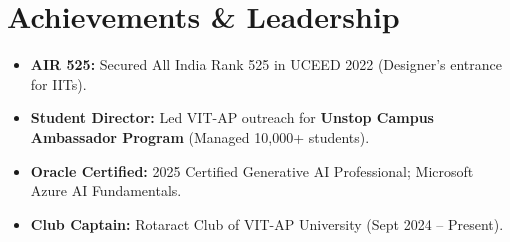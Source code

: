 \documentclass[letterpaper,11pt]{article}
\newcommand{\resumeItem}[1]{
  \item\small{
    {#1 \vspace{-2pt}}
  }
}
\newcommand{\resumeItemListStart}{\begin{itemize}}
\newcommand{\resumeItemListEnd}{\end{itemize}\vspace{-5pt}}
\begin{document}
\section{Achievements \& Leadership}
    \resumeItemListStart
        \resumeItem{\textbf{AIR 525:} Secured All India Rank 525 in UCEED 2022 (Designer's entrance for IITs).}
        \resumeItem{\textbf{Student Director:} Led VIT-AP outreach for \textbf{Unstop Campus Ambassador Program} (Managed 10,000+ students).}
        \resumeItem{\textbf{Oracle Certified:} 2025 Certified Generative AI Professional; Microsoft Azure AI Fundamentals.}
        \resumeItem{\textbf{Club Captain:} Rotaract Club of VIT-AP University (Sept 2024 -- Present).}
    \resumeItemListEnd

\end{document}
